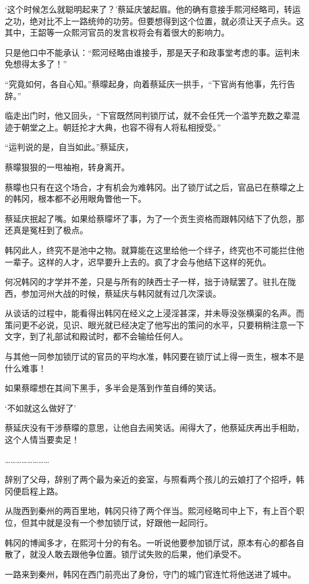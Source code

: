 ‘这个时候怎么就聪明起来了？’蔡延庆皱起眉。他的确有意接手熙河经略司，转运之功，绝对比不上一路统帅的功劳。但要想得到这个位置，就必须让天子点头。这其中，王韶等一众熙河官员的发言权将会有着很大的影响力。

只是他口中不能承认：“熙河经略由谁接手，那是天子和政事堂考虑的事。运判未免想得太多了！”

“究竟如何，各自心知。”蔡曚起身，向着蔡延庆一拱手，“下官尚有他事，先行告辞。”

临走出门时，他又回头，“下官既然同判锁厅试，就不会任凭一个滥竽充数之辈混迹于朝堂之上。朝廷抡才大典，也容不得有人将私相授受。”

“运判说的是，自当如此。”蔡延庆，

蔡曚狠狠的一甩袖袍，转身离开。

蔡曚也只有在这个场合，才有机会为难韩冈。出了锁厅试之后，官品已在蔡曚之上的韩冈，根本都不必用眼角瞥他一下。

蔡延庆抿起了嘴。如果给蔡曚坏了事，为了一个贡生资格而跟韩冈结下了仇怨，那还真是冤枉到了极点。

韩冈此人，终究不是池中之物。就算能在这里给他一个绊子，终究也不可能拦住他一辈子。这样的人才，迟早要升上去的。疯了才会与他结下这样的死仇。

何况韩冈的才学并不差，只是与所有的陕西士子一样，拙于诗赋罢了。驻扎在陇西，参加河州大战的时候，蔡延庆与韩冈就有过几次深谈。

从谈话的过程中，能看得出韩冈在经义之上浸淫甚深，并未辱没张横渠的名声。而策问更不必说，见识、眼光就已经决定了他写出的策问的水平，只要稍稍注意一下文字，到了礼部试和殿试时，都不会输给任何人。

与其他一同参加锁厅试的官员的平均水准，韩冈要在锁厅试上得一贡生，根本不是什么难事！

如果蔡曚想在其间下黑手，多半会是落到作茧自缚的笑话。

‘不如就这么做好了’

蔡延庆没有干涉蔡曚的意思，让他自去闹笑话。闹得大了，他蔡延庆再出手相助，这个人情当要卖足！

……………………

辞别了父母，辞别了两个最为亲近的妾室，与照看两个孩儿的云娘打了个招呼，韩冈便启程上路。

从陇西到秦州的两百里地，韩冈只待了两个伴当。熙河经略司中上下，有上百个职位，但其中就是没有一个参加锁厅试，好跟他一起同行。

韩冈的博闻多才，在熙河十分的有名。一听说他要参加锁厅试，原本有心的都各自散了，就没人敢去跟他争位置。锁厅试失败的后果，他们承受不。

一路来到秦州，韩冈在西门前亮出了身份，守门的城门官连忙将他送进了城中。

